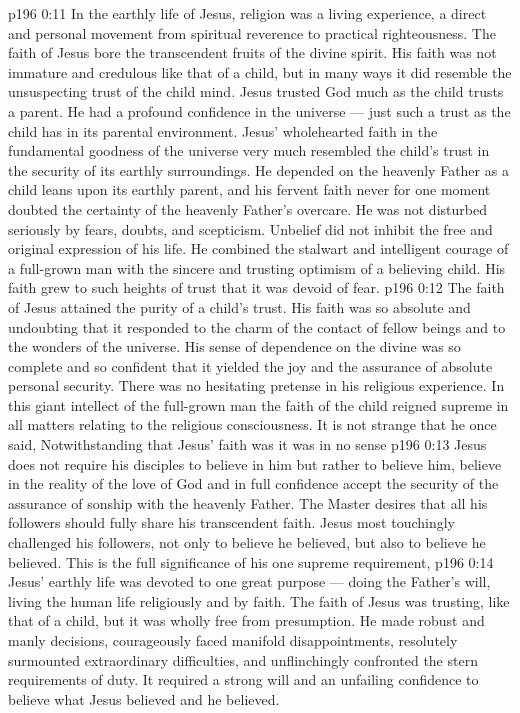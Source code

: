 \vs p196 0:11 In the earthly life of Jesus, religion was a living experience, a direct and personal movement from spiritual reverence to practical righteousness. The faith of Jesus bore the transcendent fruits of the divine spirit. His faith was not immature and credulous like that of a child, but in many ways it did resemble the unsuspecting trust of the child mind. Jesus trusted God much as the child trusts a parent. He had a profound confidence in the universe --- just such a trust as the child has in its parental environment. Jesus’ wholehearted faith in the fundamental goodness of the universe very much resembled the child’s trust in the security of its earthly surroundings. He depended on the heavenly Father as a child leans upon its earthly parent, and his fervent faith never for one moment doubted the certainty of the heavenly Father’s overcare. He was not disturbed seriously by fears, doubts, and scepticism. Unbelief did not inhibit the free and original expression of his life. He combined the stalwart and intelligent courage of a full\hyp{}grown man with the sincere and trusting optimism of a believing child. His faith grew to such heights of trust that it was devoid of fear.
\vs p196 0:12 The faith of Jesus attained the purity of a child’s trust. His faith was so absolute and undoubting that it responded to the charm of the contact of fellow beings and to the wonders of the universe. His sense of dependence on the divine was so complete and so confident that it yielded the joy and the assurance of absolute personal security. There was no hesitating pretense in his religious experience. In this giant intellect of the full\hyp{}grown man the faith of the child reigned supreme in all matters relating to the religious consciousness. It is not strange that he once said,  Notwithstanding that Jesus’ faith was  it was in no sense 
\vs p196 0:13 Jesus does not require his disciples to believe in him but rather to believe  him, believe in the reality of the love of God and in full confidence accept the security of the assurance of sonship with the heavenly Father. The Master desires that all his followers should fully share his transcendent faith. Jesus most touchingly challenged his followers, not only to believe  he believed, but also to believe  he believed. This is the full significance of his one supreme requirement, 
\vs p196 0:14 Jesus’ earthly life was devoted to one great purpose --- doing the Father’s will, living the human life religiously and by faith. The faith of Jesus was trusting, like that of a child, but it was wholly free from presumption. He made robust and manly decisions, courageously faced manifold disappointments, resolutely surmounted extraordinary difficulties, and unflinchingly confronted the stern requirements of duty. It required a strong will and an unfailing confidence to believe what Jesus believed and  he believed.
